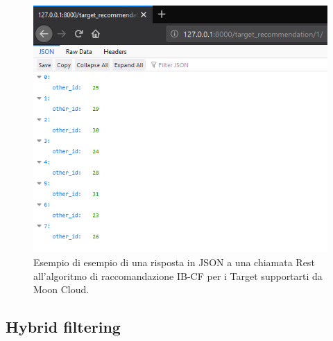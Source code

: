 \begin{figure}[ht!]
	\centering
	\includegraphics[scale=0.5]{images/IB_CF_Target_test.png}
	\caption{Esempio di esempio di una risposta in JSON a una chiamata Rest all'algoritmo di raccomandazione IB-CF per i 
	Target supportarti da Moon Cloud.}
	\label{fig:IB_CF_Target_resp_json}
\end{figure}


\subsection{Hybrid filtering} 

